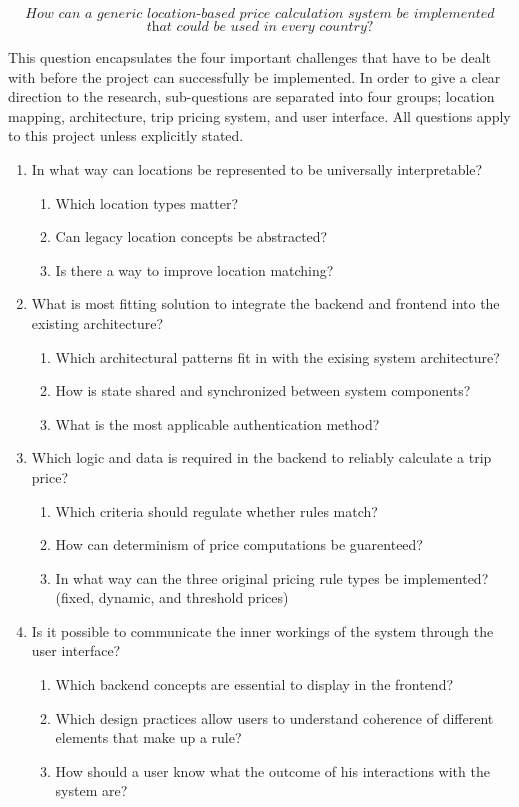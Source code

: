 \[\textit{How can a generic location-based price calculation system be implemented}\]
\[\textit{that could be used in every country?}\] \hfill

This question encapsulates the four important challenges that have to be dealt with before the project can successfully be implemented. In order to give a clear direction to the research, sub-questions are separated into four groups; location mapping, architecture, trip pricing system, and user interface. All questions apply to this project unless explicitly stated.

\begin{enumerate}
	\item In what way can locations be represented to be universally interpretable?
	\begin{enumerate}[label*=\arabic*.]
		\item Which location types matter?
		\item Can legacy location concepts be abstracted?
		\item Is there a way to improve location matching?
	\end{enumerate}

	\item What is most fitting solution to integrate the backend and frontend into the existing architecture?
	\begin{enumerate}[label*=\arabic*.]
		\item Which architectural patterns fit in with the exising system architecture?
		\item How is state shared and synchronized between system components?
		\item What is the most applicable authentication method?
	\end{enumerate}

	\item Which logic and data is required in the backend to reliably calculate a trip price?
	\begin{enumerate}[label*=\arabic*.]
		\item Which criteria should regulate whether rules match?
		\item How can determinism of price computations be guarenteed?
		\item In what way can the three original pricing rule types be implemented? (fixed, dynamic, and threshold prices)
	\end{enumerate}

	\item Is it possible to communicate the inner workings of the system through the user interface?
	\begin{enumerate}[label*=\arabic*.]
		\item Which backend concepts are essential to display in the frontend?
		\item Which design practices allow users to understand coherence of different elements that make up a rule?
		\item How should a user know what the outcome of his interactions with the system are?
	\end{enumerate}

\end{enumerate}

